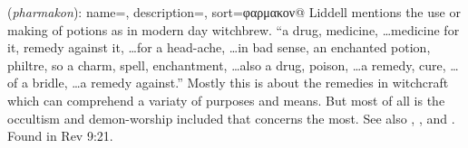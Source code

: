 \item[Witchbrew,]

(\textit{pharmakon}):
{
    name=,
    description={},
    sort=φαρμακον@
}
Liddell mentions the use or making of potions as in modern day witchbrew.  ``a drug, medicine, \ldots medicine for it, remedy against it, \ldots for a head-ache, \ldots in bad sense, an enchanted potion, philtre, so a charm, spell, enchantment, \ldots also a drug, poison, \ldots a remedy, cure, \ldots of a bridle, \ldots a remedy against.'' Mostly this is about the remedies in witchcraft which can comprehend a variaty of purposes and means. But most of all is the occultism and demon-worship included that concerns the most. See also , , and .
Found in Rev 9:21.
